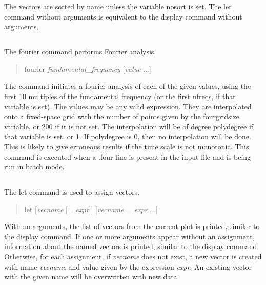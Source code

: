 The vectors are sorted by name unless the variable {\et nosort} is
set.  The {\cb let} command without arguments is equivalent to the
{\cb display} command without arguments.

\subsection{}


The {\cb fourier} command performs Fourier analysis.
\begin{quote}\vt
fourier {\it fundamental\_frequency} [{\it value} ...]
\end{quote}
The command initiates a fourier analysis of each of the given values,
using the first 10 multiples of the fundamental frequency (or the
first {\vt nfreqs}, if that variable is set).  The values may be any
valid expression.  They are interpolated onto a fixed-space grid with
the number of points given by the {\et fourgridsize} variable, or 200
if it is not set.  The interpolation will be of degree {\et
polydegree} if that variable is set, or 1.  If {\et polydegree} is 0,
then no interpolation will be done.  This is likely to give erroneous
results if the time scale is not monotonic.  This command is executed
when a {\vt .four} line is present in the input file and {\WRspice} is
being run in batch mode.

\subsection{}


The {\cb let} command is used to assign vectors.
\begin{quote}\vt
let [{\it vecname} [= {\it expr\/}]] [{\it vecname} = {\it expr\/} ...]
\end{quote}
With no arguments, the list of vectors from the current plot is
printed, similar to the {\cb display} command.  If one or more
arguments appear without an assignment, information about the named
vectors is printed, similar to the {\cb display} command.  Otherwise,
for each assignment, if {\it vecname} does not exist, a new vector is
created with name {\it vecname} and value given by the expression {\it
expr\/}.  An existing vector with the given name will be overwritten
with new data.

